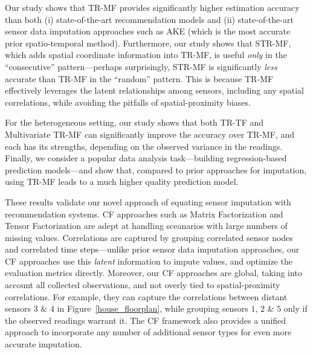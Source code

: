 Our study shows that TR-MF provides significantly higher estimation accuracy than 
both (i) state-of-the-art recommendation models and (ii) state-of-the-art sensor data imputation approaches 
such as AKE (which is the most accurate prior spatio-temporal method).
Furthermore, our study shows that STR-MF, which adds spatial coordinate information into TR-MF, 
is useful {\em only} in the ``consecutive'' pattern---perhaps surprisingly,
STR-MF is significantly {\em less} accurate than TR-MF in the ``random'' pattern.  This is because TR-MF
effectively leverages the latent relationships among sensors, including any spatial correlations, while avoiding the
pitfalls of spatial-proximity biases.

For the heterogeneous setting, our study shows that both TR-TF and
Multivariate TR-MF can significantly improve the accuracy over TR-MF,
and each has its strengths, depending on the observed variance in the
readings.  Finally, we consider a popular data analysis task---building regression-based prediction models---and show that,
compared to prior approaches for imputation, using TR-MF leads to a much higher quality prediction model.

These results validate our novel approach of equating sensor imputation with recommendation systems.  
CF approaches such as Matrix Factorization and Tensor Factorization are adept at handling sceanarios 
with large numbers of missing values.  Correlations are captured by grouping correlated sensor nodes and correlated time
steps---unlike prior sensor data imputation approaches, our CF
approaches use this {\em latent} information to impute values, and optimize the evaluation metrics directly. 
Moreover, our CF approaches are global, taking into account all
collected observations, and not overly tied to spatial-proximity
correlations.  For example, they can capture the correlations between
distant sensors $3$ \& $4$ in Figure~\ref{house_floorplan}, while
grouping sensors $1$, $2$ \& $5$ only if the observed readings warrant
it.  The CF framework also provides a unified approach to incorporate
any number of additional sensor types for even more accurate imputation.







